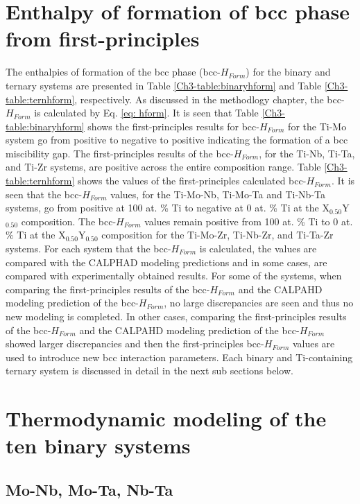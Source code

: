 \section{Enthalpy of formation of bcc phase from first-principles}

The enthalpies of formation of the bcc phase (bcc-$H_{Form}$) for the binary and ternary systems are presented in Table \ref{Ch3-table:binaryhform} and Table \ref{Ch3-table:ternhform}, respectively. As discussed in the methodlogy chapter, the bcc-$H_{Form}$ is calculated by Eq. \ref{eq: hform}. It is seen that Table \ref{Ch3-table:binaryhform} shows the first-principles results for bcc-$H_{Form}$ for the Ti-Mo system go from positive to negative to positive indicating the formation of a bcc miscibility gap. The first-principles results of the bcc-$H_{Form}$, for the Ti-Nb, Ti-Ta, and Ti-Zr systems, are positive across the entire composition range. Table \ref{Ch3-table:ternhform} shows the values of the first-principles calculated bcc-$H_{Form}$.  It is seen that the bcc-$H_{Form}$ values, for the Ti-Mo-Nb, Ti-Mo-Ta and Ti-Nb-Ta systems, go from positive at 100 at. \% Ti to negative at 0 at. \% Ti at the X$_{0.50}$Y$_{0.50}$ composition. The bcc-$H_{Form}$ values remain positive from 100 at. \% Ti to 0 at. \% Ti at the X$_{0.50}$Y$_{0.50}$ composition for the Ti-Mo-Zr, Ti-Nb-Zr, and Ti-Ta-Zr systems. For each system that the bcc-$H_{Form}$ is calculated, the values are compared with the CALPHAD modeling predictions and in some cases, are compared with experimentally obtained results. For some of the systems, when comparing the first-principles results of the bcc-$H_{Form}$ and the CALPAHD modeling prediction of the bcc-$H_{Form}$, no large discrepancies are seen and thus no new modeling is completed. In other cases, comparing the first-principles results of the bcc-$H_{Form}$ and the CALPAHD modeling prediction of the bcc-$H_{Form}$ showed larger discrepancies and then the first-principles bcc-$H_{Form}$ values are used to introduce new bcc interaction parameters. Each binary and Ti-containing ternary system is discussed in detail in the next sub sections below.

\section{Thermodynamic modeling of the ten binary systems}

\subsection{Mo-Nb, Mo-Ta, Nb-Ta}

